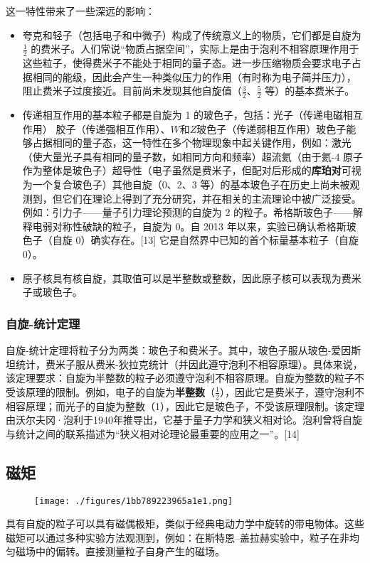 这一特性带来了一些深远的影响： 
\begin{itemize}
\item 夸克和轻子（包括电子和中微子）构成了传统意义上的物质，它们都是自旋为 \( \frac{1}{2} \) 的费米子。人们常说“物质占据空间”，实际上是由于泡利不相容原理作用于这些粒子，使得费米子不能处于相同的量子态。进一步压缩物质会要求电子占据相同的能级，因此会产生一种类似压力的作用（有时称为电子简并压力），阻止费米子过度接近。目前尚未发现其他自旋值（\( \frac{3}{2} \)、\( \frac{5}{2} \) 等）的基本费米子。  
\item 传递相互作用的基本粒子都是自旋为 1 的玻色子，包括：光子（传递电磁相互作用） 胶子（传递强相互作用）、\(W\)和\(Z\)玻色子（传递弱相互作用）玻色子能够占据相同的量子态，这一特性在多个物理现象中起关键作用，例如：激光（使大量光子具有相同的量子数，如相同方向和频率）超流氦（由于氦-4 原子作为整体是玻色子）超导性（电子虽然是费米子，但配对后形成的\textbf{库珀对}可视为一个复合玻色子）其他自旋（0、2、3 等）的基本玻色子在历史上尚未被观测到，但它们在理论上得到了充分研究，并在相关的主流理论中被广泛接受。例如：引力子——量子引力理论预测的自旋为 2 的粒子。希格斯玻色子——解释电弱对称性破缺的粒子，自旋为 0。自 2013 年以来，实验已确认希格斯玻色子（自旋 0）确实存在。[13] 它是自然界中已知的首个标量基本粒子（自旋 0）。  
\item 原子核具有核自旋，其取值可以是半整数或整数，因此原子核可以表现为费米子或玻色子。
\end{itemize}
\subsubsection{自旋-统计定理}  
自旋-统计定理将粒子分为两类：玻色子和费米子。其中，玻色子服从玻色-爱因斯坦统计，费米子服从费米-狄拉克统计（并因此遵守泡利不相容原理）。具体来说，该定理要求：自旋为半整数的粒子必须遵守泡利不相容原理。自旋为整数的粒子不受该原理的限制。例如，电子的自旋为\textbf{半整数}（\(\frac{1}{2}\)），因此它是费米子，遵守泡利不相容原理；而光子的自旋为整数（1），因此它是玻色子，不受该原理限制。该定理由沃尔夫冈·泡利于1940年推导出，它基于量子力学和狭义相对论。泡利曾将自旋与统计之间的联系描述为“狭义相对论理论最重要的应用之一”。[14]
\subsection{磁矩}
\begin{figure}[ht]
\centering
\texttt{[image: ./figures/1bb789223965a1e1.png]}
\caption{} \label{fig_Spin1_1}
\end{figure}
具有自旋的粒子可以具有磁偶极矩，类似于经典电动力学中旋转的带电物体。这些磁矩可以通过多种实验方法观测到，例如：在斯特恩–盖拉赫实验中，粒子在非均匀磁场中的偏转。直接测量粒子自身产生的磁场。

